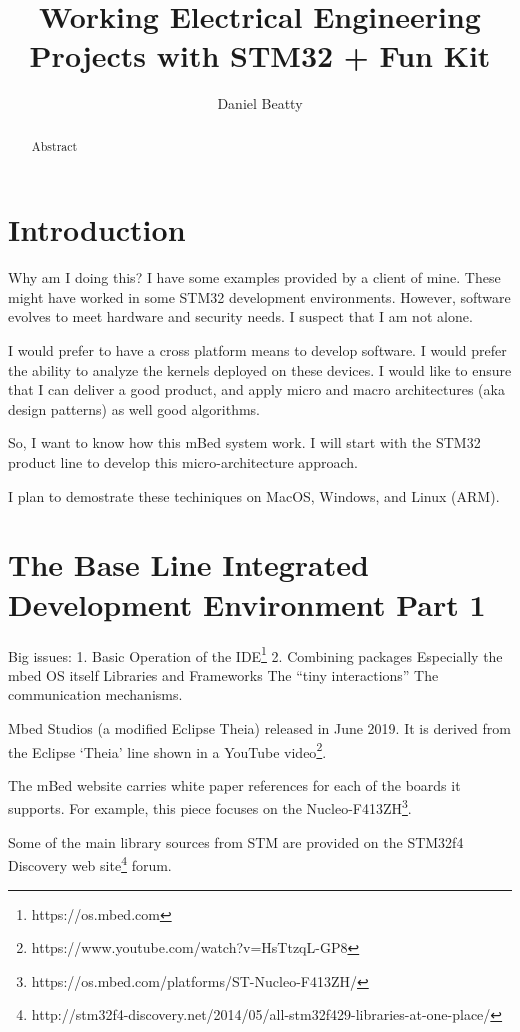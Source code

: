 \documentclass{article}
\title{Working Electrical Engineering Projects with STM32 + Fun Kit}
\author{Daniel Beatty}
\begin{document}
\maketitle

\begin{abstract}
    Abstract
\end{abstract}

\section{Introduction}


Why am I doing this?  I have some examples provided by a client of mine.  These might have worked in some STM32 development environments.  However, software evolves to meet hardware and security needs.  I suspect that I am not alone.  

I would prefer to have a cross platform means to develop software. I would prefer the ability to analyze the kernels deployed on these devices.  I would like to ensure that I can deliver a good product, and apply micro and macro architectures (aka design patterns) as well good algorithms.  

So, I want to know how this mBed system work.  I will start with the STM32 product line to develop this micro-architecture approach.  

I plan to demostrate these techiniques on MacOS, Windows, and Linux (ARM).

\section{The Base Line Integrated Development Environment Part 1} %
\label{sec:the_base_line_integrated_development_environment_part_1}

Big issues: 
1. Basic Operation of the IDE\footnote{https://os.mbed.com}
2. Combining packages
	Especially the mbed OS itself
	Libraries and Frameworks
	The ``tiny interactions''
	The communication mechanisms.

Mbed Studios (a modified Eclipse Theia) released in June 2019.  It is derived from the Eclipse `Theia' line shown in a YouTube video\footnote{https://www.youtube.com/watch?v=HsTtzqL-GP8}.

The mBed website carries white paper references for each of the boards it supports.  For example, this piece focuses on the Nucleo-F413ZH\footnote{https://os.mbed.com/platforms/ST-Nucleo-F413ZH/}.  

Some of the main library sources from STM are provided on the STM32f4 Discovery web site\footnote{http://stm32f4-discovery.net/2014/05/all-stm32f429-libraries-at-one-place/} forum.  
\end{document}
